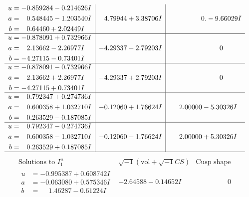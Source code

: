 \documentclass[1p]{elsarticle_modified}
\theoremstyle{definition}
\newcommand{\I}{\sqrt{-1}}
\begin{document}
$$\begin{array}{c|c|c}
\begin{aligned}
u &= -0.859284 - 0.214626 I \\
a &= \phantom{-}0.548445 - 1.203540 I \\
b &= \phantom{-}0.64460 + 2.02449 I\end{aligned}
 & \phantom{-}4.79944 + 3.38706 I & \phantom{-0.000000 } 0. - 9.66029 I \\ \hline\begin{aligned}
u &= -0.878091 + 0.732966 I \\
a &= \phantom{-}2.13662 - 2.26977 I \\
b &= -4.27115 - 0.73401 I\end{aligned}
 & -4.29337 - 2.79203 I & \phantom{-0.000000 } 0 \\ \hline\begin{aligned}
u &= -0.878091 - 0.732966 I \\
a &= \phantom{-}2.13662 + 2.26977 I \\
b &= -4.27115 + 0.73401 I\end{aligned}
 & -4.29337 + 2.79203 I & \phantom{-0.000000 } 0 \\ \hline\begin{aligned}
u &= \phantom{-}0.792347 + 0.274736 I \\
a &= \phantom{-}0.600358 + 1.032710 I \\
b &= \phantom{-}0.263529 - 0.187085 I\end{aligned}
 & -0.12060 + 1.76624 I & \phantom{-}2.00000 - 5.30326 I \\ \hline\begin{aligned}
u &= \phantom{-}0.792347 - 0.274736 I \\
a &= \phantom{-}0.600358 - 1.032710 I \\
b &= \phantom{-}0.263529 + 0.187085 I\end{aligned}
 & -0.12060 - 1.76624 I & \phantom{-}2.00000 + 5.30326 I\\
 \hline 
 \end{array}$$\newpage$$\begin{array}{c|c|c}  
\text{Solutions to }I^u_{1}& \I (\text{vol} + \sqrt{-1}CS) & \text{Cusp shape}\\
 \hline 
\begin{aligned}
u &= -0.995387 + 0.608742 I \\
a &= -0.063080 + 0.575346 I \\
b &= \phantom{-}1.46287 - 0.61224 I\end{aligned}
 & -2.64588 - 0.14652 I & \phantom{-0.000000 } 0 \\ \hline\begin{aligned}

\end{aligned}
\end{array}$$
\end{document}
